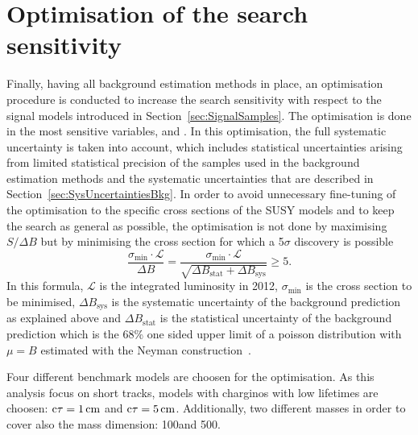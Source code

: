 \chapter{Optimisation of the search sensitivity}
\label{sec:Optimisation}
Finally, having all background estimation methods in place, an optimisation procedure is conducted to increase the search sensitivity with respect to the signal models introduced in Section~\ref{sec:SignalSamples}.
The optimisation is done in the most sensitive variables, \pt and \ias.
In this optimisation, the full systematic uncertainty is taken into account, which includes statistical uncertainties arising from limited statistical precision of the samples used in the background estimation methods and the systematic uncertainties that are described in Section~\ref{sec:SysUncertaintiesBkg}.
In order to avoid unnecessary fine-tuning of the optimisation to the specific cross sections of the SUSY models and to keep the search as general as possible, 
the optimisation is not done by maximising  $S/\Delta B$ but by minimising the cross section for which a 5$\sigma$ discovery is possible
\begin{equation}
\label{eq:optimisation}
\frac{\sigma_{\text{min}}\cdot \mathcal{L}}{\Delta B} = \frac{\sigma_{\text{min}}\cdot \mathcal{L}}{\sqrt{ \Delta B_{\text{stat}} + \Delta B_{\text{sys}}}} \geq 5.
\end{equation} 
In this formula, $\mathcal{L}$ is the integrated luminosity in 2012, $\sigma_{\text{min}}$ is the cross section to be minimised, $\Delta B_{\text{sys}}$ is the systematic uncertainty of the background prediction as explained above and 
$\Delta B_{\text{stat}}$ is the statistical uncertainty of the background prediction which is the 68\% one sided upper limit of a poisson distribution with $\mu = B$ estimated with the 
Neyman construction~\cite{bib:Neyman_1937,bib:PDG_2014}.

Four different benchmark models are choosen for the optimisation.
As this analysis focus on short tracks, models with charginos with low lifetimes are choosen: $\text{c}\tau=1\,\text{cm}$ and $\text{c}\tau=5\,\text{cm}$. 
Additionally, two different masses in order to cover also the mass dimension: 100\gev and 500\gev.

